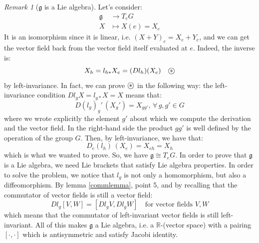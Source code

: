\documentclass[a4paper,11pt,titlepage, article, oneside]{memoir}
\numberwithin{equation}{section}
\theoremstyle{definition}
\theoremstyle{remark}
\newtheorem{remark}[theorem]{Remark}
\newcommand{\rfield}{\mathbb{R}}
\newcommand{\lie}[1]{\mathfrak{#1}}
\newcommand\oast{\stackMath\mathbin{\stackinset{c}{0ex}{c}{0ex}{\ast}{\bigcirc}}}
\begin{document}
\begin{remarkbox} \begin{remark}[$\lie{g}$ is a Lie algebra]
Let's consider:
\begin{align}
\lie{g} &\rightarrow T_e G \\
X &\mapsto X(e) = X_e \nonumber
\end{align}
It is an isomorphism since it is linear, i.e. $(X + Y)_e = X_e + Y_e$, and we can get the vector field back from the vector field itself evaluated at $e$. Indeed, the inverse is:
$$X_h = l_{h*} X_e= (Dl_h)(X_e) \quad \oast$$
by left-invariance. In fact, we can prove $\oast$ in the following way: the left-invariance condition $D l_g X = l_{g*}X = X$ means that: 
$$D(l_g)_g'\, (X_g') = X_{g g'}, \, \forall\, g, g' \in G$$
where we wrote explicitly the element $g'$ about which we compute the derivation and the vector field. In the right-hand side the product $gg'$ is well defined by the operation of the group $G$. Then, by left-invariance, we have that:
$$D_e(l_h)\, (X_e) = X_{e h} = X_h$$
which is what we wanted to prove.
So, we have $\lie{g} \cong T_e G$. In order to prove that $\lie{g}$ is a Lie algebra, we need Lie brackets that satisfy Lie algebra properties. In order to solve the problem, we notice that $l_g$ is not only a homomorphism, but also a diffeomorphism. By lemma \ref{commlemma}, point 5, and by recalling that the commutator of vector fields is still a vector field:
$$Dl_g [V, W] = [Dl_g V, Dl_g W] \quad \text{for vector fields } V, W$$
which means that the commutator of left-invariant vector fields is still left-invariant.
All of this makes $\lie{g}$ a Lie algebra, i.e. a $\rfield$-(vector space) with a pairing $[\cdot, \cdot]$ which is antisymmetric and satisfy Jacobi identity.
\end{remark} \end{remarkbox}
\end{document}
